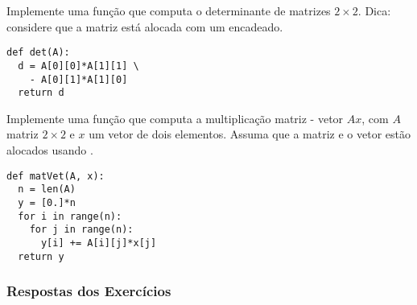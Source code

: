\begin{exer}
  Implemente uma função que computa o determinante de matrizes $2\times 2$. Dica: considere que a matriz está alocada com um {\PYTHONlist} encadeado.
\end{exer}
\begin{resp}
  
\begin{lstlisting}
def det(A):
  d = A[0][0]*A[1][1] \
    - A[0][1]*A[1][0]
  return d
\end{lstlisting}

\end{resp}

\begin{exer}
  Implemente uma função que computa a multiplicação matriz - vetor $Ax$, com $A$ matriz $2\times 2$ e $x$ um vetor de dois elementos. Assuma que a matriz e o vetor estão alocados usando {\PYTHONlist}.
\end{exer}
\begin{resp}
  
\begin{lstlisting}
def matVet(A, x):
  n = len(A)
  y = [0.]*n
  for i in range(n):
    for j in range(n):
      y[i] += A[i][j]*x[j]
  return y
\end{lstlisting}

\end{resp}

\ifisbook 
\subsubsection*{Respostas dos Exercícios}
\shipoutAnswer
\fi


